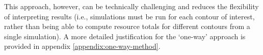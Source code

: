 This approach, however, can be technically challenging and reduces the flexibility of interpreting results (i.e., simulations must be run for each contour of interest, rather than being able to compute resource totals for different contours from a single simulation). A more detailed justification for the `one-way' approach is provided in appendix \ref{appendix:one-way-method}.


